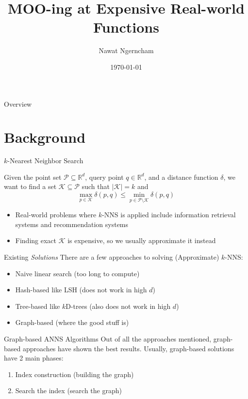 \documentclass{beamer}
\title{MOO-ing at Expensive Real-world Functions}
\author{Nawat Ngerncham}
\date{\today}
\begin{document}
\begin{frame}
  \titlepage
\end{frame}

\begin{frame}{Overview}
  \tableofcontents
\end{frame}

\section{Background}

\begin{frame}{\(k\)-Nearest Neighbor Search}
\begin{definition}
    Given the point set \(\mathcal{P} \subseteq \mathbb{R}^d\), query point \(q \in \mathbb{R}^d\), and a distance function \(\delta\), we want to find a set \(\mathcal{K} \subseteq \mathcal{P}\) such that \(|\mathcal{K}| = k\) and
    \[
        \max_{p \in \mathcal{K}} \delta(p, q) \leq \min_{p \in \mathcal{P} \setminus \mathcal{K}} \delta(p, q)
    \]
    \end{definition}
    \begin{itemize}
        \item Real-world problems where \(k\)-NNS is applied include information retrieval systems and recommendation systems
        \item Finding exact \(\mathcal{K}\) is expensive, so we usually approximate it instead
    \end{itemize}
\end{frame}

\begin{frame}{Existing \textit{Solutions}}
    There are a few approaches to solving (Approximate) \(k\)-NNS:
    \begin{itemize}
        \item Naive linear search (too long to compute)
        \item Hash-based like LSH (does not work in high \(d\))
        \item Tree-based like \(k\)D-trees (also does not work in high \(d\))
        \item Graph-based (where the good stuff is)
    \end{itemize}
\end{frame}

\begin{frame}{Graph-based ANNS Algorithms}
    Out of all the approaches mentioned, graph-based approaches have shown the best results. Usually, graph-based solutions have 2 main phases:
    \begin{enumerate}
        \item Index construction (building the graph)
        \item Search the index (search the graph)
    \end{enumerate}
\end{frame}
\end{document}
